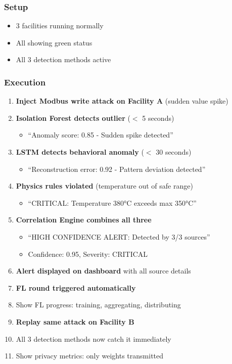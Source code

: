 \documentclass[11pt,a4paper]{article}
\begin{document}
\subsubsection{Setup}
\begin{itemize}[leftmargin=*]
    \item 3 facilities running normally
    \item All showing green status
    \item All 3 detection methods active
\end{itemize}

\subsubsection{Execution}

\begin{enumerate}[leftmargin=*]
    \item \textbf{Inject Modbus write attack on Facility A} (sudden value spike)
    \item \textbf{Isolation Forest detects outlier} ($<$ 5 seconds)
    \begin{itemize}
        \item ``Anomaly score: 0.85 - Sudden spike detected''
    \end{itemize}
    \item \textbf{LSTM detects behavioral anomaly} ($<$ 30 seconds)
    \begin{itemize}
        \item ``Reconstruction error: 0.92 - Pattern deviation detected''
    \end{itemize}
    \item \textbf{Physics rules violated} (temperature out of safe range)
    \begin{itemize}
        \item ``CRITICAL: Temperature 380°C exceeds max 350°C''
    \end{itemize}
    \item \textbf{Correlation Engine combines all three}
    \begin{itemize}
        \item ``HIGH CONFIDENCE ALERT: Detected by 3/3 sources''
        \item Confidence: 0.95, Severity: CRITICAL
    \end{itemize}
    \item \textbf{Alert displayed on dashboard} with all source details
    \item \textbf{FL round triggered automatically}
    \item Show FL progress: training, aggregating, distributing
    \item \textbf{Replay same attack on Facility B}
    \item All 3 detection methods now catch it immediately
    \item Show privacy metrics: only weights transmitted
\end{enumerate}
\end{document}
